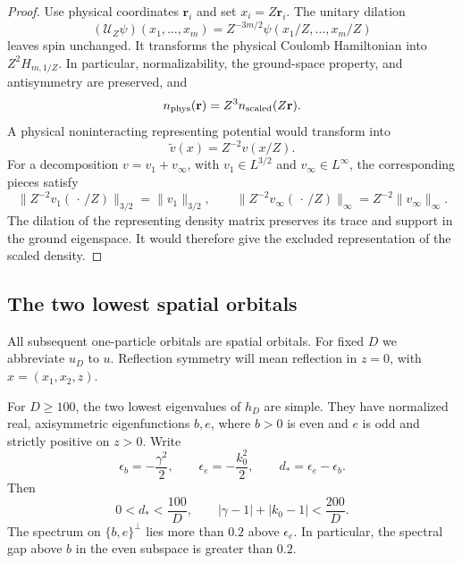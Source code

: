 \begin{proof}
Use physical coordinates \(\mathbf r_i\) and set \(x_i=Z\mathbf r_i\).
The unitary dilation
\[
 (\mathcal U_Z\psi)(x_1,\ldots,x_m)
 =Z^{-3m/2}\psi(x_1/Z,\ldots,x_m/Z)
\]
leaves spin unchanged.  It transforms the physical Coulomb Hamiltonian
into \(Z^2H_{m,1/Z}\).  In particular, normalizability, the ground-space
property, and antisymmetry are preserved, and
\[
 n_{\rm phys}(\mathbf r)=Z^3 n_{\rm scaled}(Z\mathbf r).
\]
A physical noninteracting representing potential would transform into
\[
 \widetilde v(x)=Z^{-2}v(x/Z).
\]
For a decomposition \(v=v_1+v_\infty\), with
\(v_1\in L^{3/2}\) and \(v_\infty\in L^\infty\), the corresponding
pieces satisfy
\[
 \|Z^{-2}v_1(\,\cdot\,/Z)\|_{3/2}=\|v_1\|_{3/2},
 \qquad
 \|Z^{-2}v_\infty(\,\cdot\,/Z)\|_\infty
 =Z^{-2}\|v_\infty\|_\infty .
\]
The dilation of the representing density matrix preserves its trace
and support in the ground eigenspace.  It would therefore give the
excluded representation of the scaled density.
\end{proof}

\subsection{The two lowest spatial orbitals}

All subsequent one-particle orbitals are spatial orbitals.  For fixed
\(D\) we abbreviate \(u_D\) to \(u\).  Reflection symmetry will mean
reflection in \(z=0\), with \(x=(x_1,x_2,z)\).

\begin{proposition}
\label{prop:two-centre-spectrum}
For \(D\ge100\), the two lowest eigenvalues of \(h_D\) are simple.
They have normalized real, axisymmetric eigenfunctions \(b,e\), where
\(b>0\) is even and \(e\) is odd and strictly positive on \(z>0\).
Write
\[
 \epsilon_b=-\frac{\gamma^2}{2},\qquad
 \epsilon_e=-\frac{k_0^2}{2},\qquad
 d_*=\epsilon_e-\epsilon_b .
\]
Then
\begin{equation}
 0<d_*<\frac{100}{D},\qquad
 |\gamma-1|+|k_0-1|<\frac{200}{D}.
 \label{eq:two-centre-numerics}
\end{equation}
The spectrum on \(\{b,e\}^{\perp}\) lies more than \(0.2\) above
\(\epsilon_e\).  In particular, the spectral gap above \(b\) in the
even subspace is greater than \(0.2\).
\end{proposition}

